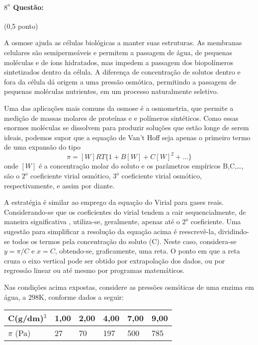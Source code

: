 \documentclass[12pt,a4paper]{article}
\begin{document}
 
 \paragraph{$8^a$ Questão:} (0,5 ponto)
 
 A osmose ajuda as células biológicas a manter suas estruturas.  As membranas celulares são semipermeáveis e permitem a passagem de água, de pequenas moléculas e de íons hidratados, mas impedem a passagem dos biopolímeros sintetizados dentro da célula. A diferença de concentração de solutos dentro e fora da célula dá origem a uma pressão osmótica, permitindo a passagem de pequenas moléculas nutrientes, em um processo naturalmente seletivo.
 
 Uma das aplicações mais comuns da osmose é a osmometria, que permite a  medição de massas molares de proteínas e e polímeros sintéticos. Como essas enormes moléculas se dissolvem para produzir soluções que estão longe de serem ideais, podemos supor que a equação de Van't Hoff seja apenas o primeiro termo de uma expansão do tipo
 $$  \pi = [W]RT\{1+B[W]+C[W]^2+\dots\}$$
 onde $[W]$ é a concentração molar do soluto e os parâmetros empíricos B,C,\dots, são o $2^o$ coeficiente virial osmótico, $3^o$ coeficiente virial osmótico, respectivamente, e assim por diante.
 
 A estratégia é similar ao emprego da equação do Virial para gases reais. Considerando-se que os coeficientes do virial tendem a cair sequencialmente, de maneira significativa , utiliza-se, geralmente, apenas até o $2^o$ coeficiente. Uma sugestão para simplificar a resolução da equação acima é reescrevê-la, dividindo-se todos os termos pela concentração do soluto (C).  Neste caso, considera-se $y=\pi/C$ e $x=C$, obtendo-se, graficamente, uma reta. O ponto em que a reta cruza o eixo vertical pode ser obtido por extrapolação dos dados, ou por regressão linear ou até mesmo por programas matemáticos.
 
 Nas condições acima expostas, considere as pressões osmóticas de uma enzima em água, a $298$K, conforme dados a seguir:
 
 \begin{center}
  \begin{tabular}{| l | l | l | l | l | l | }
    \hline
    C(g/dm)$^3$ & 1,00 & 2,00 & 4,00 & 7,00 & 9,00 \\ \hline
    $\pi$ (Pa)  & 27 & 70 & 197 & 500 & 785 \\ \hline
  \end{tabular}
\end{center}
 
\end{document}
